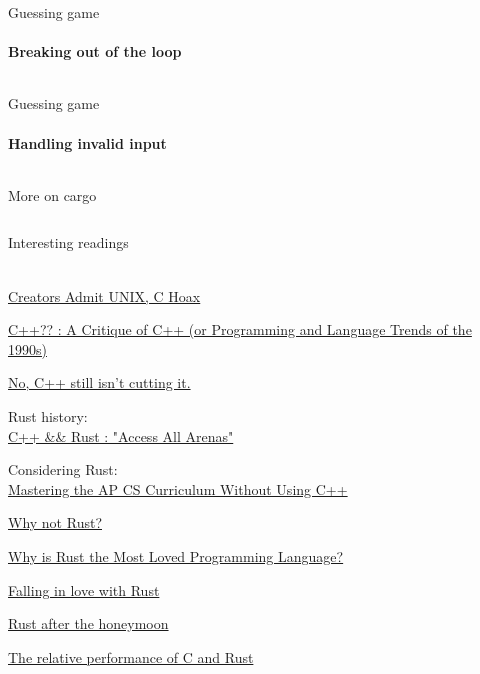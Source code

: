 \documentclass[usenames,dvipsnames,10pt,aspectratio=169]{beamer}
\begin{document}
\begin{frame}{Guessing game}
	\framesubtitle{Breaking out of the loop}
	\inputminted[fontsize=\large]{c}{code/guess6.rs}
\end{frame}

\begin{frame}{Guessing game}
	\framesubtitle{Handling invalid input}
	\inputminted[fontsize=\normalsize]{c}{code/guess7.rs}
\end{frame}

\begin{frame}{More on cargo}
	\inputminted[fontsize=\large]{shell}{code/cargo.sh}
	\vspace{0.5cm}
\end{frame}


\begin{frame}{Interesting readings} 

\\

\href{https://web.archive.org/web/19980425023657/http://paul.merton.ox.ac.uk/computing/unix.html}
{Creators Admit UNIX, C Hoax}

\href{https://web.archive.org/web/19990302094922/http://www.elj.com/cppcv3/}
{C++?? : A Critique of C++ (or Programming and Language Trends of the 1990s)}

\href{https://da-data.blogspot.com/2020/10/no-c-still-isnt-cutting-it.html}
{No, C++ still isn't cutting it.}

\vspace{0.5cm}
Rust history:\\ 

\href{https://youtu.be/HiWkMFE8uRE}{C++ \&\& Rust : "Access All Arenas"}

\vspace{0.5cm}
Considering Rust:\\

\href{https://web.archive.org/web/20030625015044/http://www.cs.rice.edu/CS/PLT/Teaching/Talks/TCEA-State-1998/C++/}
{Mastering the AP CS Curriculum Without Using C++}

\href{https://matklad.github.io/2020/09/20/why-not-rust.html}
{Why not Rust?}

\href{https://matklad.github.io/2020/02/14/why-rust-is-loved.html}
{Why is Rust the Most Loved Programming Language?}

\href{http://dtrace.org/blogs/bmc/2018/09/18/falling-in-love-with-rust/}
{Falling in love with Rust}

\href{http://dtrace.org/blogs/bmc/2020/10/11/rust-after-the-honeymoon/}
{Rust after the honeymoon}

\href{http://dtrace.org/blogs/bmc/2018/09/28/the-relative-performance-of-c-and-rust/}
{The relative performance of C and Rust}

\end{frame}
\end{document}
